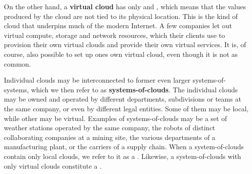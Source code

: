 On the other hand, a \textbf{virtual cloud} has only  and , which means that the values produced by the cloud are not tied to its physical location.
This is the kind of cloud that underpins much of the modern Internet.
A few companies let out virtual compute, storage and network resources, which their clients use to provision their own virtual clouds and provide their own virtual services.
It is, of course, also possible to set up ones own virtual cloud, even though it is not as common.

Individual clouds may be interconnected to former even larger systems-of-systems, which we then refer to as \textbf{systems-of-clouds}.
The individual clouds may be owned and operated by different departments, subdivisions or teams at the same company, or even by different legal entities.
Some of them may be local, while other may be virtual.
Examples of systems-of-clouds may be a set of weather stations operated by the same company, the robots of distinct collaborating companies at a mining site, the various departments of a manufacturing plant, or the carriers of a supply chain.
When a system-of-clouds contain only local clouds, we refer to it as a .
Likewise, a system-of-clouds with only virtual clouds constitute a .
